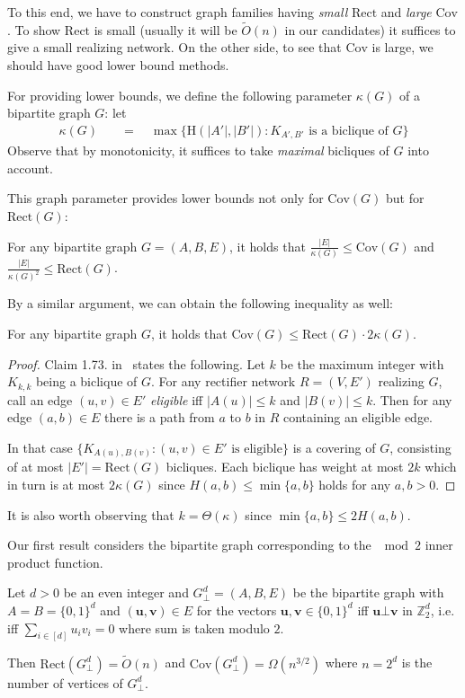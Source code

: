 \documentclass[submission]{llncs}
\def\Cov{{\mathrm{Cov}}}
\def\Rect{{\mathrm{Rect}}}
\def\Harm{{\mathrm{H}}}
\def\bs#1{{\boldsymbol{#1}}}
\begin{document}
  To this end, we have to construct graph families having \emph{small} $\Rect$ and \emph{large} $\Cov$.
  To show $\Rect$ is small (usually it will be $\tilde{O}(n)$ in our candidates) it suffices to give a small realizing network.
  On the other side, to see that $\Cov$ is large, we should have good lower bound methods.

  For providing lower bounds, we define the following parameter $\kappa(G)$ of a bipartite graph $G$: let
  \begin{align*}
  \kappa(G)\quad&=\quad\max\{\Harm(|A'|,|B'|):K_{A',B'}\textrm{ is a biclique of }G\}\end{align*}
  Observe that by monotonicity, it suffices to take \emph{maximal} bicliques of $G$ into account.


  This graph parameter provides lower bounds not only for $\Cov(G)$ but for $\Rect(G)$:
  \begin{proposition}
  \label{prop-kappa}
  For any bipartite graph $G=(A,B,E)$, it holds that $\frac{|E|}{\kappa(G)}\leq\Cov(G)$ and $\frac{|E|}{\kappa(G)^2}\le\Rect(G)$.
  \end{proposition}
  By a similar argument, we can obtain the following inequality as well:
  \begin{proposition}
  \label{prop-cov-rect2kappa}
  For any bipartite graph $G$, it holds that $\Cov(G)\leq\Rect(G)\cdot 2\kappa(G)$.
  \end{proposition}
  \begin{proof}
  Claim 1.73. in~\cite{JuknaChapter2013} states the following. Let $k$ be the maximum integer with $K_{k,k}$ being
  a biclique of $G$. For any rectifier network $R=(V,E')$ realizing $G$, call an edge $(u,v)\in E'$
  \emph{eligible} iff $|A(u)|\leq k$ and $|B(v)|\leq k$. Then for any edge $(a,b)\in E$ there is a path from $a$ to $b$
  in $R$ containing an eligible edge.

In that case $\{K_{A(u),B(v)}:(u,v)\in E'\textrm{ is eligible}\}$
  is a covering of $G$, consisting of at most $|E'|=\Rect(G)$ bicliques.
  Each biclique has weight at most $2k$ which in turn is
  at most $2\kappa(G)$ since $H(a,b)\leq \min\{a,b\}$ holds for any $a,b>0$.
  \end{proof}

  It is also worth observing that $k=\Theta(\kappa)$
  since $\min\{a,b\}\leq 2H(a,b)$.

  Our first result considers the bipartite graph corresponding to the $\mod 2$ inner product function.
  \begin{theorem}
  \label{thm-orthogonal}
  Let $d>0$ be an even integer and $G^d_\bot=(A,B,E)$ be the bipartite graph with $A=B=\{0,1\}^d$ and
  $(\bs{u},\bs{v})\in E$ for the vectors $\bs{u},\bs{v}\in\{0,1\}^d$ iff $\bs{u}\bot\bs{v}$ in $\mathbb{Z}_2^d$, i.e.
  iff $\sum\limits_{i\in[d]}u_iv_i=0$ where sum is taken modulo $2$.

  Then $\Rect(G^d_\bot)=\tilde{O}(n)$ and $\Cov(G^d_\bot)=\Omega(n^{3/2})$
  where $n=2^d$ is the number of vertices of $G^d_\bot$.
  \end{theorem}
\end{document}
